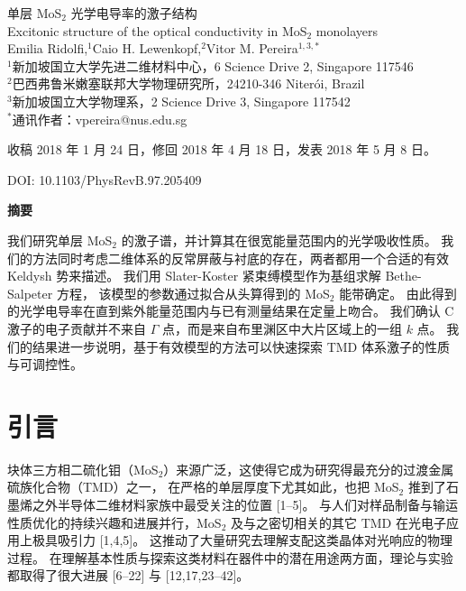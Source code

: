 \documentclass[11pt,a4paper]{ctexart}
\begin{document}
\thispagestyle{empty}

\begin{center}
{\LARGE 单层 MoS$_2$ 光学电导率的激子结构}\\[2mm]
{\large Excitonic structure of the optical conductivity in MoS$_2$ monolayers}\\[5mm]
Emilia Ridolfi,$^{1}$\quad Caio H. Lewenkopf,$^{2}$\quad Vitor M. Pereira$^{1,3,*}$\\[2.5mm]
{\small
$^{1}$新加坡国立大学先进二维材料中心，6 Science Drive 2, Singapore 117546\\
$^{2}$巴西弗鲁米嫩塞联邦大学物理研究所，24210-346 Niterói, Brazil\\
$^{3}$新加坡国立大学物理系，2 Science Drive 3, Singapore 117542\\
$^{*}$通讯作者：vpereira@nus.edu.sg}
\end{center}

\vspace{1mm}
{\small\noindent 收稿 2018 年 1 月 24 日，修回 2018 年 4 月 18 日，发表 2018 年 5 月 8 日。\par}
{\small\noindent DOI: 10.1103/PhysRevB.97.205409\par}

\vspace{5mm}
\begin{center}
\textbf{摘要}
\end{center}
{\noindent
我们研究单层 MoS$_2$ 的激子谱，并计算其在很宽能量范围内的光学吸收性质。
我们的方法同时考虑二维体系的反常屏蔽与衬底的存在，两者都用一个合适的有效 Keldysh 势来描述。
我们用 Slater-Koster 紧束缚模型作为基组求解 Bethe-Salpeter 方程，
该模型的参数通过拟合从头算得到的 MoS$_2$ 能带确定。
由此得到的光学电导率在直到紫外能量范围内与已有测量结果在定量上吻合。
我们确认 C 激子的电子贡献并不来自 $\Gamma$ 点，而是来自布里渊区中大片区域上的一组 $k$ 点。
我们的结果进一步说明，基于有效模型的方法可以快速探索 TMD 体系激子的性质与可调控性。\par}

\vspace{8mm}

\section{引言}

块体三方相二硫化钼（MoS$_2$）来源广泛，这使得它成为研究得最充分的过渡金属硫族化合物（TMD）之一，
在严格的单层厚度下尤其如此，也把 MoS$_2$ 推到了石墨烯之外半导体二维材料家族中最受关注的位置 [1--5]。
与人们对样品制备与输运性质优化的持续兴趣和进展并行，MoS$_2$ 及与之密切相关的其它 TMD
在光电子应用上极具吸引力 [1,4,5]。
这推动了大量研究去理解支配这类晶体对光响应的物理过程。
在理解基本性质与探索这类材料在器件中的潜在用途两方面，理论与实验都取得了很大进展
[6--22] 与 [12,17,23--42]。
\end{document}
